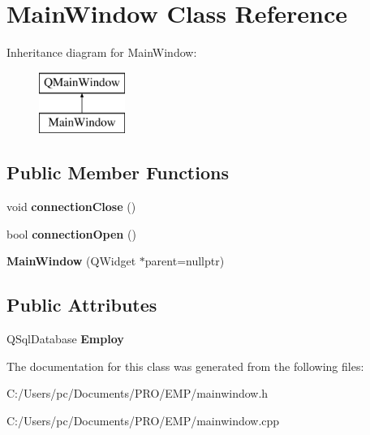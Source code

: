 \hypertarget{class_main_window}{}\section{Main\+Window Class Reference}
\label{class_main_window}
Inheritance diagram for Main\+Window\+:\begin{figure}[H]
\begin{center}
\leavevmode
\includegraphics[height=2.000000cm]{class_main_window}
\end{center}
\end{figure}
\subsection*{Public Member Functions}
\begin{DoxyCompactItemize}
\item 
\mbox{\label{class_main_window_a57019e6e2280b38e01d682512a33fb91}} 
void {\bfseries connection\+Close} ()
\item 
\mbox{\label{class_main_window_a1c01c05ca5290d3920ce01b69ad6f69d}} 
bool {\bfseries connection\+Open} ()
\item 
\mbox{\label{class_main_window_a996c5a2b6f77944776856f08ec30858d}} 
{\bfseries Main\+Window} (Q\+Widget $\ast$parent=nullptr)
\end{DoxyCompactItemize}
\subsection*{Public Attributes}
\begin{DoxyCompactItemize}
\item 
\mbox{\label{class_main_window_afb299526cf3286937e7c11c3c5f21c0d}} 
Q\+Sql\+Database {\bfseries Employ}
\end{DoxyCompactItemize}


The documentation for this class was generated from the following files\+:\begin{DoxyCompactItemize}
\item 
C\+:/\+Users/pc/\+Documents/\+P\+R\+O/\+E\+M\+P/mainwindow.\+h\item 
C\+:/\+Users/pc/\+Documents/\+P\+R\+O/\+E\+M\+P/mainwindow.\+cpp\end{DoxyCompactItemize}
